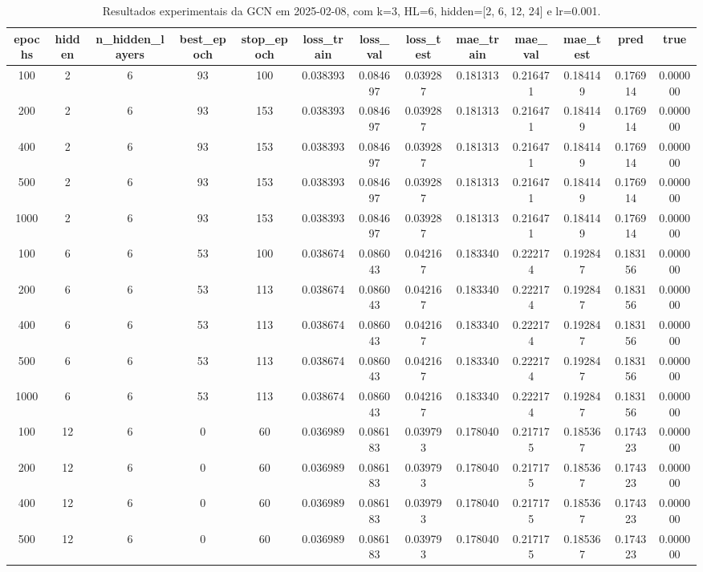 \begin{table}[h]
\centering
\caption{Resultados experimentais da GCN em 2025-02-08, com k=3, HL=6, hidden=[2, 6, 12, 24] e lr=0.001.}
\label{tab:gcn_results_k3_hl6_d20250208}
\begin{tabular}{ccccccccccccc}
\toprule
epochs & hidden & n\_hidden\_layers & best\_epoch & stop\_epoch & loss\_train & loss\_val & loss\_test & mae\_train & mae\_val & mae\_test & pred & true \\
\midrule
100 & 2 & 6 & 93 & 100 & 0.038393 & 0.084697 & 0.039287 & 0.181313 & 0.216471 & 0.184149 & 0.176914 & 0.000000 \\
200 & 2 & 6 & 93 & 153 & 0.038393 & 0.084697 & 0.039287 & 0.181313 & 0.216471 & 0.184149 & 0.176914 & 0.000000 \\
400 & 2 & 6 & 93 & 153 & 0.038393 & 0.084697 & 0.039287 & 0.181313 & 0.216471 & 0.184149 & 0.176914 & 0.000000 \\
500 & 2 & 6 & 93 & 153 & 0.038393 & 0.084697 & 0.039287 & 0.181313 & 0.216471 & 0.184149 & 0.176914 & 0.000000 \\
1000 & 2 & 6 & 93 & 153 & 0.038393 & 0.084697 & 0.039287 & 0.181313 & 0.216471 & 0.184149 & 0.176914 & 0.000000 \\
100 & 6 & 6 & 53 & 100 & 0.038674 & 0.086043 & 0.042167 & 0.183340 & 0.222174 & 0.192847 & 0.183156 & 0.000000 \\
200 & 6 & 6 & 53 & 113 & 0.038674 & 0.086043 & 0.042167 & 0.183340 & 0.222174 & 0.192847 & 0.183156 & 0.000000 \\
400 & 6 & 6 & 53 & 113 & 0.038674 & 0.086043 & 0.042167 & 0.183340 & 0.222174 & 0.192847 & 0.183156 & 0.000000 \\
500 & 6 & 6 & 53 & 113 & 0.038674 & 0.086043 & 0.042167 & 0.183340 & 0.222174 & 0.192847 & 0.183156 & 0.000000 \\
1000 & 6 & 6 & 53 & 113 & 0.038674 & 0.086043 & 0.042167 & 0.183340 & 0.222174 & 0.192847 & 0.183156 & 0.000000 \\
100 & 12 & 6 & 0 & 60 & 0.036989 & 0.086183 & 0.039793 & 0.178040 & 0.217175 & 0.185367 & 0.174323 & 0.000000 \\
200 & 12 & 6 & 0 & 60 & 0.036989 & 0.086183 & 0.039793 & 0.178040 & 0.217175 & 0.185367 & 0.174323 & 0.000000 \\
400 & 12 & 6 & 0 & 60 & 0.036989 & 0.086183 & 0.039793 & 0.178040 & 0.217175 & 0.185367 & 0.174323 & 0.000000 \\
500 & 12 & 6 & 0 & 60 & 0.036989 & 0.086183 & 0.039793 & 0.178040 & 0.217175 & 0.185367 & 0.174323 & 0.000000 \\

\end{tabular}
\end{table}

